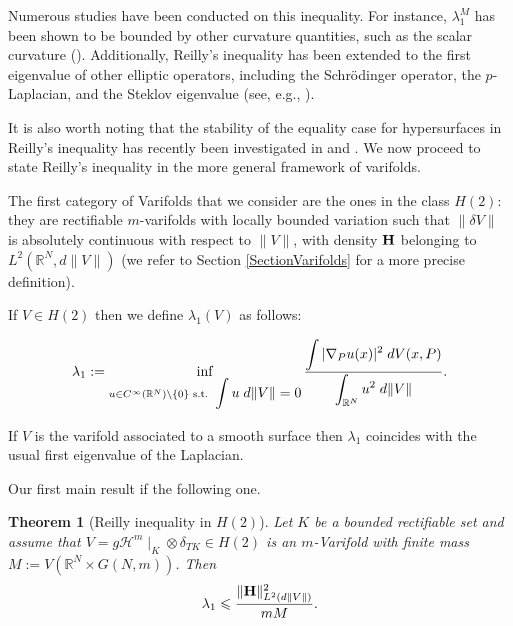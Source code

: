\documentclass[12pt,english]{smfart} %
\newtheorem{theorem}{Theorem}[section]
\theoremstyle{remark}
\newcommand{\HH}{\mathcal{H}} %
\begin{document}
Numerous studies have been conducted on this inequality. For instance, $\lambda_1^M$ has been shown to be bounded by other curvature quantities, such as the scalar curvature (\cite{AleDocRos,Gro1}). Additionally, Reilly's inequality has been extended to the first eigenvalue of other elliptic operators, including the Schrödinger operator, the $p$-Laplacian, and the Steklov eigenvalue (see, e.g., \cite{CheGui,CheWan,ElsIli2,Gro0,Gro2,IliMak,RotUpa}).

It is also worth noting that the stability of the equality case for hypersurfaces in Reilly’s inequality has recently been investigated in \cite{AubGro1} and \cite{AubGro2}. We now proceed to state Reilly's inequality in the more general framework of varifolds.


The first category of Varifolds    that we consider are the ones in the class $H(2)$: they are rectifiable $m$-varifolds  with locally bounded  variation such that  $\|\delta V\|$ is absolutely continuous with respect to $\|V\|$, with density ${\bf H}$  belonging to $L^2(\mathbb{R}^N,d\|V\|)$ (we refer to Section \ref{SectionVarifolds} for a more precise definition).


If $V\in H(2)$ then we define $\lambda_1(V)$ as follows:

 
 \begin{eqnarray} \lambda_1:=\inf_{u \in C^\infty(\mathbb{R}^N) \setminus \{0\} \text{ s.t. } \displaystyle\int  u \; d\|V\|=0} \dfrac{\displaystyle\int |\nabla_P u(x)|^2 \;d V(x,P)}{\displaystyle \int_{\mathbb{R}^N} u^2\;d\|V\|}.  \notag
 \end{eqnarray}
 
 
If $V$ is the varifold associated to a smooth surface then $\lambda_1$ coincides with the usual first eigenvalue of the Laplacian.  



Our first main result if the following one.


\medskip

\medskip\begin{theorem}[Reilly inequality in $H(2)$] \label{reilly1} Let $K$ be a bounded rectifiable set and assume that $V=g\HH^m\mid_{K}\otimes\delta_{TK}\in H(2)$ is an $m$-Varifold with finite mass  $M:= V(\mathbb{R}^N\times G(N,m))$. Then
 \begin{eqnarray}
 \lambda_1 \leqslant \frac{\|{\bf H} \|^2_{L^2(d\|V\|)}}{mM}. \label{ineqR}
\end{eqnarray} 
 \end{theorem}
 
\end{document}
